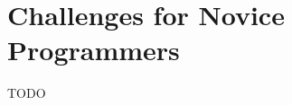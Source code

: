 \section{Challenges for Novice Programmers} %
  \label{Challenges for Novice Programmers} %


\begin{justify}
    TODO
\end{justify}






